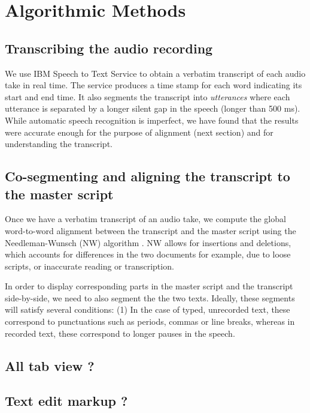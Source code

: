 \section{Algorithmic Methods}
\label{sec:algorithms}
\subsection{Transcribing the audio recording}
We use IBM Speech to Text Service \cite{ibmspeechtotext} to obtain a verbatim transcript of each audio take in real time. The service produces a time stamp for each word indicating its start and end time. It also segments the transcript into \textit{utterances} where each utterance is separated by a longer silent gap in the speech (longer than 500 ms). While automatic speech recognition is imperfect, we have found that the results were accurate enough for the purpose of alignment (next section) and for understanding the transcript.
  
\subsection{Co-segmenting and aligning the transcript to the master script}
Once we have a verbatim transcript of an audio take, we compute the global word-to-word alignment between the transcript and the master script using the Needleman-Wunsch (NW) algorithm \cite{needleman1970general}. NW allows for insertions and deletions, which accounts for differences in the two documents for example, due to loose scripts, or inaccurate reading or transcription.

In order to display corresponding parts in the master script and the transcript side-by-side, we need to also segment the the two texts. Ideally, these segments will satisfy several conditions:  (1) In the case of typed, unrecorded text, these correspond to punctuations such as periods, commas or line breaks, whereas in recorded text, these correspond to longer pauses in the speech. 


\subsection{All tab view ?}
\subsection{Text edit markup ?}
